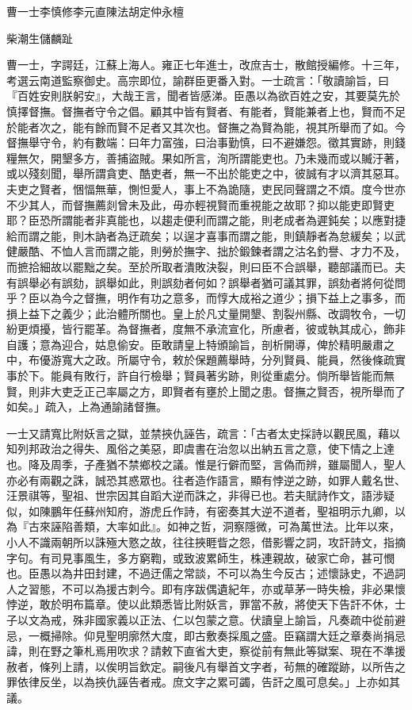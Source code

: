
\begin{pinyinscope}
曹一士李慎修李元直陳法胡定仲永檀

柴潮生儲麟趾

曹一士，字諤廷，江蘇上海人。雍正七年進士，改庶吉士，散館授編修。十三年，考選云南道監察御史。高宗即位，諭群臣更番入對。一士疏言：「敬讀諭旨，曰『百姓安則朕躬安』，大哉王言，聞者皆感涕。臣愚以為欲百姓之安，其要莫先於慎擇督撫。督撫者守令之倡。顧其中皆有賢者、有能者，賢能兼者上也，賢而不足於能者次之，能有餘而賢不足者又其次也。督撫之為賢為能，視其所舉而了如。今督撫舉守令，約有數端：曰年力富強，曰治事勤慎，曰不避嫌怨。徵其實跡，則錢糧無欠，開墾多方，善捕盜賊。果如所言，洵所謂能吏也。乃未幾而或以贓汙著，或以殘刻聞，舉所謂貪吏、酷吏者，無一不出於能吏之中，彼誠有才以濟其惡耳。夫吏之賢者，悃愊無華，惻怛愛人，事上不為詭隨，吏民同聲謂之不煩。度今世亦不少其人，而督撫薦剡曾未及此，毋亦輕視賢而重視能之故耶？抑以能吏即賢吏耶？臣恐所謂能者非真能也，以趨走便利而謂之能，則老成者為遲鈍矣；以應對捷給而謂之能，則木訥者為迂疏矣；以逞才喜事而謂之能，則鎮靜者為怠緩矣；以武健嚴酷、不恤人言而謂之能，則勞於撫字、拙於鍛鍊者謂之沽名釣譽、才力不及，而摭拾細故以罷黜之矣。至於所取者潰敗決裂，則曰臣不合誤舉，聽部議而已。夫有誤舉必有誤劾，誤舉如此，則誤劾者何如？誤舉者猶可議其罪，誤劾者將何從問乎？臣以為今之督撫，明作有功之意多，而惇大成裕之道少；損下益上之事多，而損上益下之義少；此治體所關也。皇上於凡丈量開墾、割裂州縣、改調牧令，一切紛更煩擾，皆行罷革。為督撫者，度無不承流宣化，所慮者，彼或執其成心，飾非自護；意為迎合，姑息偷安。臣敢請皇上特頒諭旨，剖析開導，俾於精明嚴肅之中，布優游寬大之政。所屬守令，敕於保題薦舉時，分列賢員、能員，然後條疏實事於下。能員有敗行，許自行檢舉；賢員著劣跡，則從重處分。倘所舉皆能而無賢，則非大吏乏正己率屬之方，即賢者有壅於上聞之患。督撫之賢否，視所舉而了如矣。」疏入，上為通諭諸督撫。

一士又請寬比附妖言之獄，並禁挾仇誣告，疏言：「古者太史採詩以觀民風，藉以知列邦政治之得失、風俗之美惡，即虞書在治忽以出納五言之意，使下情之上達也。降及周季，子產猶不禁鄉校之議。惟是行僻而堅，言偽而辨，雖屬聞人，聖人亦必有兩觀之誅，誠恐其惑眾也。往者造作語言，顯有悖逆之跡，如罪人戴名世、汪景祺等，聖祖、世宗因其自蹈大逆而誅之，非得已也。若夫賦詩作文，語涉疑似，如陳鵬年任蘇州知府，游虎丘作詩，有密奏其大逆不道者，聖祖明示九卿，以為『古來誣陷善類，大率如此』。如神之哲，洞察隱微，可為萬世法。比年以來，小人不識兩朝所以誅殛大憝之故，往往挾睚眥之怨，借影響之詞，攻訐詩文，指摘字句。有司見事風生，多方窮鞫，或致波累師生，株連親故，破家亡命，甚可憫也。臣愚以為井田封建，不過迂儒之常談，不可以為生今反古；述懷詠史，不過詞人之習態，不可以為援古刺今。即有序跋偶遺紀年，亦或草茅一時失檢，非必果懷悖逆，敢於明布篇章。使以此類悉皆比附妖言，罪當不赦，將使天下告訐不休，士子以文為戒，殊非國家義以正法、仁以包蒙之意。伏讀皇上諭旨，凡奏疏中從前避忌，一概掃除。仰見聖明廓然大度，即古敷奏採風之盛。臣竊謂大廷之章奏尚捐忌諱，則在野之筆札焉用吹求？請敕下直省大吏，察從前有無此等獄案、現在不準援赦者，條列上請，以俟明旨欽定。嗣後凡有舉首文字者，茍無的確蹤跡，以所告之罪依律反坐，以為挾仇誣告者戒。庶文字之累可蠲，告訐之風可息矣。」上亦如其議。


\end{pinyinscope}
